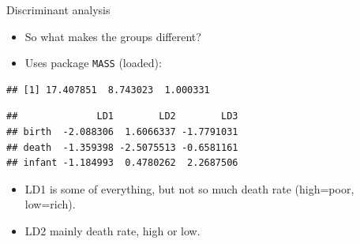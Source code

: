\documentclass[
  ignorenonframetext,
]{beamer}
\newenvironment{Shaded}{\begin{snugshade}}{\end{snugshade}}
\newcommand{\DataTypeTok}[1]{\textcolor[rgb]{0.13,0.29,0.53}{#1}}
\newcommand{\KeywordTok}[1]{\textcolor[rgb]{0.13,0.29,0.53}{\textbf{#1}}}
\newcommand{\NormalTok}[1]{#1}
\newcommand{\OperatorTok}[1]{\textcolor[rgb]{0.81,0.36,0.00}{\textbf{#1}}}
\newcommand{\StringTok}[1]{\textcolor[rgb]{0.31,0.60,0.02}{#1}}
\begin{document}
\begin{frame}[fragile]{Discriminant analysis}
\protect\hypertarget{discriminant-analysis-4}{}

\begin{itemize}
\item
  So what makes the groups different?
\item
  Uses package \texttt{MASS} (loaded):
\end{itemize}

\footnotesize

\begin{Shaded}
\end{Shaded}

\begin{verbatim}
## [1] 17.407851  8.743023  1.000331
\end{verbatim}

\begin{Shaded}
\end{Shaded}

\begin{verbatim}
##              LD1        LD2        LD3
## birth  -2.088306  1.6066337 -1.7791031
## death  -1.359398 -2.5075513 -0.6581161
## infant -1.184993  0.4780262  2.2687506
\end{verbatim}

\normalsize

\begin{itemize}
\item
  LD1 is some of everything, but not so much death rate (high=poor,
  low=rich).
\item
  LD2 mainly death rate, high or low.
\end{itemize}

\end{frame}
\end{document}
